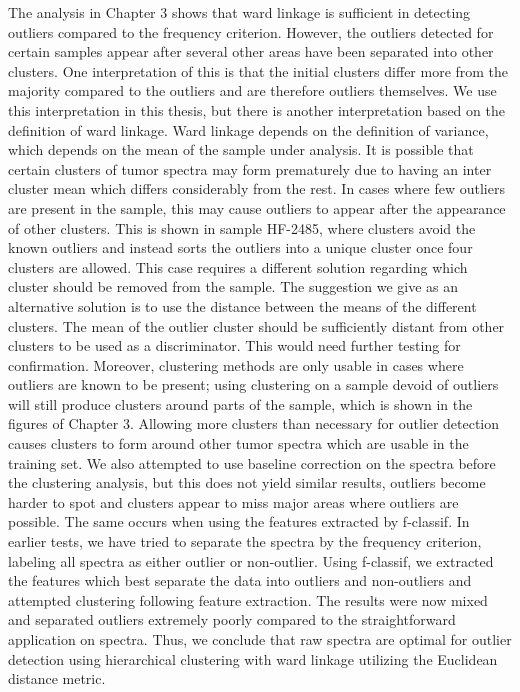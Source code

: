 The analysis in Chapter 3 shows that ward linkage is sufficient in detecting outliers compared to the frequency criterion. However, the outliers detected for certain samples appear after several other areas have been separated into other clusters. One interpretation of this is that the initial clusters differ more from the majority compared to the outliers and are therefore outliers themselves. We use this interpretation in this thesis, but there is another interpretation based on the definition of ward linkage. Ward linkage depends on the definition of variance, which depends on the mean of the sample under analysis. It is possible that certain clusters of tumor spectra may form prematurely due to having an inter cluster mean which differs considerably from the rest. In cases where few outliers are present in the sample, this may cause outliers to appear after the appearance of other clusters. This is shown in sample HF-2485, where clusters avoid the known outliers and instead sorts the outliers into a unique cluster once four clusters are allowed. This case requires a different solution regarding which cluster should be removed from the sample. The suggestion we give as an alternative solution is to use the distance between the means of the different clusters. The mean of the outlier cluster should be sufficiently distant from other clusters to be used as a discriminator. This would need further testing for confirmation. Moreover, clustering methods are only usable in cases where outliers are known to be present; using clustering on a sample devoid of outliers will still produce clusters around parts of the sample, which is shown in the figures of Chapter 3. Allowing more clusters than necessary for outlier detection causes clusters to form around other tumor spectra which are usable in the training set. We also attempted to use baseline correction on the spectra before the clustering analysis, but this does not yield similar results, outliers become harder to spot and clusters appear to miss major areas where outliers are possible. The same occurs when using the features extracted by f-classif. In earlier tests, we have tried to separate the spectra by the frequency criterion, labeling all spectra as either outlier or non-outlier. Using f-classif, we extracted the features which best separate the data into outliers and non-outliers and attempted clustering following feature extraction. The results were now mixed and separated outliers extremely poorly compared to the straightforward application on spectra. Thus, we conclude that raw spectra are optimal for outlier detection using hierarchical clustering with ward linkage utilizing the Euclidean distance metric.

